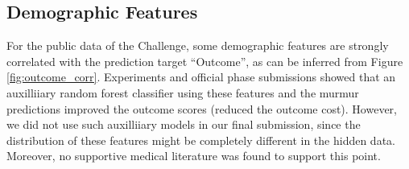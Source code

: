 

\subsection{Demographic Features}
\label{subsec:demo_feat}

For the public data of the Challenge, some demographic features are strongly correlated with the prediction target ``Outcome'', as can be inferred from Figure \ref{fig:outcome_corr}. Experiments and official phase submissions showed that an auxilliiary random forest classifier using these features and the murmur predictions improved the outcome scores (reduced the outcome cost). However, we did not use such auxilliiary models in our final submission, since the distribution of these features might be completely different in the hidden data. Moreover, no supportive medical literature was found to support this point.


